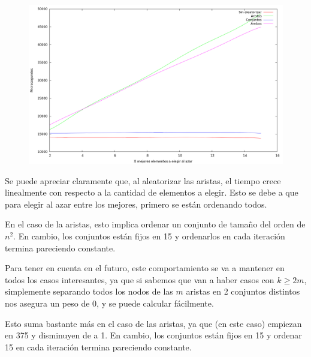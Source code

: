 \begin{figure}[H]
  \begin{center}
    \includegraphics[scale=0.35]{imagenes/grasp-goloso-x-tiempo.png}
  \end{center}
\end{figure}

\vspace*{0.2cm}

Se puede apreciar claramente que, al aleatorizar las aristas, el tiempo crece
linealmente con respecto a la cantidad de elementos a elegir. Esto se debe
a que para elegir al azar entre los mejores, primero se están ordenando todos.

En el caso de la aristas, esto implica ordenar un conjunto de tamaño del orden
de $n^2$. En cambio, los conjuntos están fijos en 15 y ordenarlos en cada
iteración termina pareciendo constante.

Para tener en cuenta en el futuro, este comportamiento se va a mantener en
todos los casos interesantes, ya que si sabemos que van a haber casos con
$k \geq 2m$, simplemente separando todos los nodos de las $m$ aristas en 2
conjuntos distintos nos asegura un peso de 0, y se puede calcular fácilmente.

Esto suma bastante más en el caso de las aristas, ya que (en este caso)
empiezan en 375 y disminuyen de a 1. En cambio, los conjuntos están fijos en
15 y ordenar 15 en cada iteración termina pareciendo constante.

\vspace*{0.5cm}

